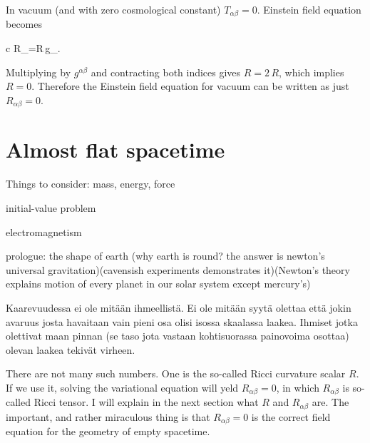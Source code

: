 \documentclass[11pt,oneside%
]{memoir}
\newenvironment{eqna}{\begin{IEEEeqnarray*}{c}}{\end{IEEEeqnarray*}\ignorespacesafterend}
\begin{document}
In vacuum (and with zero cosmological constant) \(T_{\alpha\beta}=0\). Einstein field equation becomes
\begin{eqna}
R_{\alpha\beta}=R\,g_{\alpha\beta}.
\end{eqna}
Multiplying by \(g^{\alpha\beta}\) and contracting both indices gives \(R=2\,R\), which implies \(R=0\). Therefore the Einstein field equation for vacuum can be written as just \(R_{\alpha\beta}=0\).
















\chapter{Almost flat spacetime}

Things to consider: mass, energy, force

initial-value problem

electromagnetism

prologue: the shape of earth (why earth is round? the answer is newton's universal gravitation)(cavensish experiments demonstrates it)(Newton's theory explains motion of every planet in our solar system except mercury's)

\newpage
\tableofcontents

Kaarevuudessa ei ole mitään ihmeellistä. Ei ole mitään syytä olettaa että jokin avaruus josta havaitaan vain pieni osa olisi isossa skaalassa laakea. Ihmiset jotka olettivat maan pinnan (se taso jota vastaan kohtisuorassa painovoima osottaa) olevan laakea tekivät virheen.

\newpage
There are not many such numbers. One is the so-called Ricci curvature scalar \(R\). If we use it, solving the variational equation will yeld \(R_{\alpha\beta}=0\), in which \(R_{\alpha\beta}\) is so-called Ricci tensor. I will explain in the next section what \(R\) and \(R_{\alpha\beta}\) are. The important, and rather miraculous thing is that \(R_{\alpha\beta}=0\) is the correct field equation for the geometry of empty spacetime.
\end{document}
